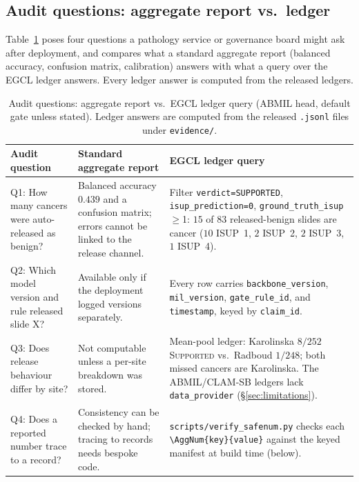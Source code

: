 \documentclass{article}
\newcommand{\SafeNum}[1]{#1}
\newcommand{\AggNum}[2]{#2}
\begin{document}
\subsection*{Audit questions: aggregate report vs.\ ledger}

Table~\ref{tab:audit-comparison} poses four questions a pathology service or governance board might ask after deployment, and compares what a standard aggregate report (balanced accuracy, confusion matrix, calibration) answers with what a query over the EGCL ledger answers. Every ledger answer is computed from the released ledgers.

\begin{table}[h]
\centering
\caption{Audit questions: aggregate report vs.\ EGCL ledger query (ABMIL head, default gate unless stated). Ledger answers are computed from the released \texttt{.jsonl} files under \texttt{evidence/}.}
\label{tab:audit-comparison}
\setlength{\tabcolsep}{4pt}
\small
\begin{tabular}{@{}p{3.3cm}p{4.3cm}p{5.6cm}@{}}
\toprule
Audit question & Standard aggregate report & EGCL ledger query \\
\midrule
Q1: How many cancers were auto-released as benign? &
  Balanced accuracy $\SafeNum{0.439}$ and a confusion matrix; errors cannot be linked to the release channel. &
  Filter \texttt{verdict=SUPPORTED}, \texttt{isup\_prediction=0}, \texttt{ground\_truth\_isup}$\ge$1: $\AggNum{abmil.supported.missed_cancer}{15}$ of $\AggNum{abmil.supported.grade0.n}{83}$ released-benign slides are cancer ($\SafeNum{10}$ ISUP~1, $\SafeNum{2}$ ISUP~2, $\SafeNum{2}$ ISUP~3, $\SafeNum{1}$ ISUP~4). \\
\addlinespace
Q2: Which model version and rule released slide X? &
  Available only if the deployment logged versions separately. &
  Every row carries \texttt{backbone\_version}, \texttt{mil\_version}, \texttt{gate\_rule\_id}, and \texttt{timestamp}, keyed by \texttt{claim\_id}. \\
\addlinespace
Q3: Does release behaviour differ by site? &
  Not computable unless a per-site breakdown was stored. &
  Mean-pool ledger: Karolinska $\SafeNum{8}/\SafeNum{252}$ \textsc{Supported} vs.\ Radboud $\SafeNum{1}/\SafeNum{248}$; both missed cancers are Karolinska. The ABMIL/CLAM-SB ledgers lack \texttt{data\_provider} (\S\ref{sec:limitations}). \\
\addlinespace
Q4: Does a reported number trace to a record? &
  Consistency can be checked by hand; tracing to records needs bespoke code. &
  \texttt{scripts/verify\_safenum.py} checks each \texttt{\textbackslash AggNum\{key\}\{value\}} against the keyed manifest at build time (below). \\
\bottomrule
\end{tabular}
\end{table}
\end{document}
